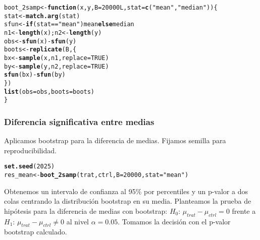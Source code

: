 \documentclass[paper=letter, fontsize=11pt, draft=false]{scrartcl}\usepackage[]{graphicx}\usepackage[]{xcolor}
\makeatletter
\newcommand{\hlnum}[1]{\textcolor[rgb]{0.686,0.059,0.569}{#1}}%
\newcommand{\hlsng}[1]{\textcolor[rgb]{0.192,0.494,0.8}{#1}}%
\newcommand{\hlopt}[1]{\textcolor[rgb]{0,0,0}{#1}}%
\newcommand{\hldef}[1]{\textcolor[rgb]{0.345,0.345,0.345}{#1}}%
\newcommand{\hlkwa}[1]{\textcolor[rgb]{0.161,0.373,0.58}{\textbf{#1}}}%
\newcommand{\hlkwb}[1]{\textcolor[rgb]{0.69,0.353,0.396}{#1}}%
\newcommand{\hlkwc}[1]{\textcolor[rgb]{0.333,0.667,0.333}{#1}}%
\newcommand{\hlkwd}[1]{\textcolor[rgb]{0.737,0.353,0.396}{\textbf{#1}}}%
\newenvironment{kframe}{%
 \def\at@end@of@kframe{}%
 \ifinner\ifhmode%
  \def\at@end@of@kframe{\end{minipage}}%
  \begin{minipage}{\columnwidth}%
 \fi\fi%
 \def\FrameCommand##1{\hskip\@totalleftmargin \hskip-\fboxsep
 \colorbox{shadecolor}{##1}\hskip-\fboxsep
     \hskip-\linewidth \hskip-\@totalleftmargin \hskip\columnwidth}%
 \MakeFramed {\advance\hsize-\width
   \@totalleftmargin\z@ \linewidth\hsize
   \@setminipage}}%
 {\par\unskip\endMakeFramed%
 \at@end@of@kframe}
\newenvironment{knitrout}{}{} %
\numberwithin{equation}{problemcounter} %
\numberwithin{figure}{problemcounter} %
\numberwithin{table}{problemcounter} %
\numberwithin{subsection}{problemcounter}
\makeatother
\begin{document}
\begin{knitrout}
\color{fgcolor}\begin{kframe}
\begin{alltt}
\hldef{boot_2samp} \hlkwb{<-} \hlkwa{function}\hldef{(}\hlkwc{x}\hldef{,} \hlkwc{y}\hldef{,} \hlkwc{B} \hldef{=} \hlnum{20000L}\hldef{,} \hlkwc{stat} \hldef{=} \hlkwd{c}\hldef{(}\hlsng{"mean"}\hldef{,} \hlsng{"median"}\hldef{))\{}
    \hldef{stat} \hlkwb{<-} \hlkwd{match.arg}\hldef{(stat)}
    \hldef{sfun} \hlkwb{<-} \hlkwa{if} \hldef{(stat} \hlopt{==} \hlsng{"mean"}\hldef{) mean} \hlkwa{else} \hldef{median}
    \hldef{n1} \hlkwb{<-} \hlkwd{length}\hldef{(x); n2} \hlkwb{<-} \hlkwd{length}\hldef{(y)}
    \hldef{obs} \hlkwb{<-} \hlkwd{sfun}\hldef{(x)} \hlopt{-} \hlkwd{sfun}\hldef{(y)}
    \hldef{boots} \hlkwb{<-} \hlkwd{replicate}\hldef{(B, \{}
        \hldef{bx} \hlkwb{<-} \hlkwd{sample}\hldef{(x, n1,} \hlkwc{replace} \hldef{=} \hlnum{TRUE}\hldef{)}
        \hldef{by} \hlkwb{<-} \hlkwd{sample}\hldef{(y, n2,} \hlkwc{replace} \hldef{=} \hlnum{TRUE}\hldef{)}
        \hlkwd{sfun}\hldef{(bx)} \hlopt{-} \hlkwd{sfun}\hldef{(by)}
    \hldef{\})}
    \hlkwd{list}\hldef{(}\hlkwc{obs} \hldef{= obs,} \hlkwc{boots} \hldef{= boots)}
\hldef{\}}
\end{alltt}
\end{kframe}
\end{knitrout}

\subsubsection{Diferencia significativa entre medias}

Aplicamos bootstrap para la diferencia de medias. Fijamos semilla para reproducibilidad.

\begin{knitrout}
\color{fgcolor}\begin{kframe}
\begin{alltt}
\hlkwd{set.seed}\hldef{(}\hlnum{2025}\hldef{)}
\hldef{res_mean} \hlkwb{<-} \hlkwd{boot_2samp}\hldef{(trat, ctrl,} \hlkwc{B} \hldef{=} \hlnum{20000}\hldef{,} \hlkwc{stat} \hldef{=} \hlsng{"mean"}\hldef{)}
\end{alltt}
\end{kframe}
\end{knitrout}

Obtenemos un intervalo de confianza al 95\% por percentiles y un p-valor a dos colas centrando la distribución bootstrap en su media. Planteamos la prueba de hipótesis para la diferencia de medias con bootstrap: \(H_0:\,\mu_{trat}-\mu_{ctrl}=0\) frente a \(H_1:\,\mu_{trat}-\mu_{ctrl}\neq 0\) al nivel \(\alpha=0.05\). Tomamos la decisión con el p-valor bootstrap calculado. 
\end{document}

